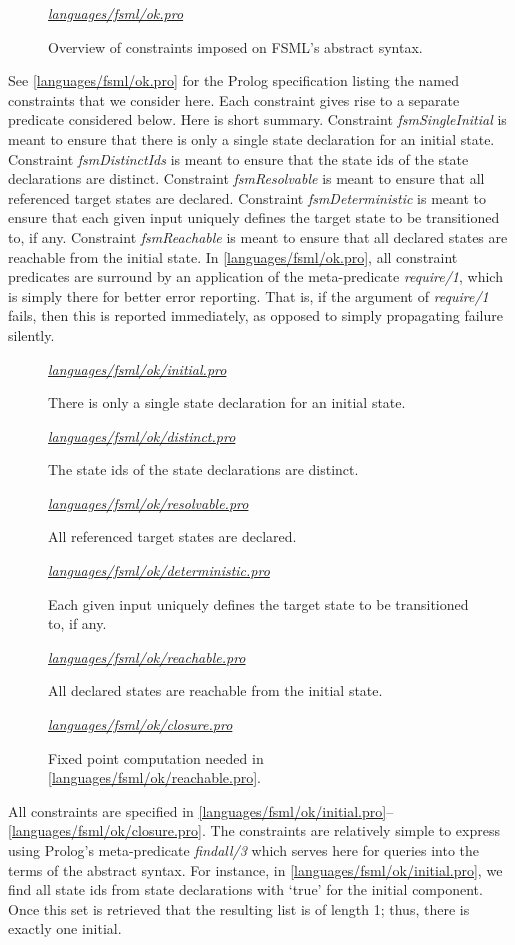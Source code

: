 \documentclass[preprint,authoryear,12pt]{noelsarticle}
\newcommand{\codefigure}[3]{
\begin{figure}[t!]
\begin{boxedminipage}{\hsize}
\mbox{}\hfill{}{\small\textit{\href{http://github.com/slebok/slepro/tree/master/#2}{#2}}}

\end{boxedminipage}
\caption{#1.}
\label{#2}
\medskip
\end{figure}}
\begin{document}
\codefigure{%
Overview of constraints imposed on FSML's abstract syntax}{%
languages/fsml/ok.pro}{%
prolog}

See \autoref{languages/fsml/ok.pro} for the Prolog specification
listing the named constraints that we consider here. Each constraint
gives rise to a separate predicate considered below. Here is short
summary. Constraint \emph{fsmSingleInitial} is meant to ensure that
there is only a single state declaration for an initial
state. Constraint \emph{fsmDistinctIds} is meant to ensure that the
state ids of the state declarations are distinct. Constraint
\emph{fsmResolvable} is meant to ensure that all referenced target
states are declared. Constraint \emph{fsmDeterministic} is meant
to ensure that each given input uniquely defines the target state to
be transitioned to, if any. Constraint \emph{fsmReachable} is meant to
ensure that all declared states are reachable from the
initial state. In \autoref{languages/fsml/ok.pro}, all constraint
predicates are surround by an application of the meta-predicate
\emph{require/1}, which is simply there for better error
reporting. That is, if the argument of \emph{require/1} fails, then
this is reported immediately, as opposed to simply propagating failure
silently.

\codefigure{%
There is only a single state declaration for an initial state}{%
languages/fsml/ok/initial.pro}{%
prolog}

\codefigure{%
The state ids of the state declarations are distinct}{%
languages/fsml/ok/distinct.pro}{%
prolog}

\codefigure{%
All referenced target states are declared}{%
languages/fsml/ok/resolvable.pro}{%
prolog}

\codefigure{%
Each given input uniquely defines the target state to be transitioned to, if any}{%
languages/fsml/ok/deterministic.pro}{%
prolog}

\codefigure{%
All declared states are reachable from the initial state}{%
languages/fsml/ok/reachable.pro}{%
prolog}

\codefigure{%
Fixed point computation needed in \autoref{languages/fsml/ok/reachable.pro}}{%
languages/fsml/ok/closure.pro}{%
prolog}

All constraints are specified in
\autoref{languages/fsml/ok/initial.pro}--\autoref{languages/fsml/ok/closure.pro}. The
constraints are relatively simple to express using Prolog's
meta-predicate \emph{findall/3} which serves here for queries into the
terms of the abstract syntax. For instance, in
\autoref{languages/fsml/ok/initial.pro}, we find all state ids from
state declarations with `true' for the initial component. Once this
set is retrieved that the resulting list is of length 1; thus, there
is exactly one initial.
\end{document}
